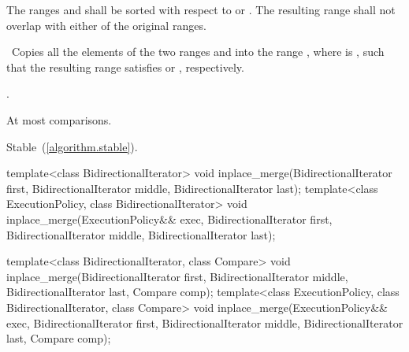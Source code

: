 \begin{itemdescr}
\pnum
\requires The ranges  and  shall be
sorted with respect to  or .
The resulting range shall not overlap with either of the original ranges.

\pnum
\effects\ Copies all the elements of the two ranges  and
 into the range , where 
is , such that the resulting range satisfies
 or , respectively.

\pnum
\returns
{}.

\pnum
\complexity
At most
comparisons.

\pnum
\remarks Stable~(\ref{algorithm.stable}).
\end{itemdescr}

%
\begin{itemdecl}
template<class BidirectionalIterator>
  void inplace_merge(BidirectionalIterator first,
                     BidirectionalIterator middle,
                     BidirectionalIterator last);
template<class ExecutionPolicy, class BidirectionalIterator>
  void inplace_merge(ExecutionPolicy&& exec,
                     BidirectionalIterator first,
                     BidirectionalIterator middle,
                     BidirectionalIterator last);

template<class BidirectionalIterator, class Compare>
  void inplace_merge(BidirectionalIterator first,
                     BidirectionalIterator middle,
                     BidirectionalIterator last, Compare comp);
template<class ExecutionPolicy, class BidirectionalIterator, class Compare>
  void inplace_merge(ExecutionPolicy&& exec,
                     BidirectionalIterator first,
                     BidirectionalIterator middle,
                     BidirectionalIterator last, Compare comp);
\end{itemdecl}

